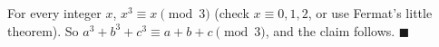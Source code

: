 For every integer $x$, $x^3\equiv x\pmod3$ (check $x\equiv0,1,2$, or use Fermat's little theorem). So $a^3+b^3+c^3\equiv a+b+c\pmod3$, and the claim follows. $\blacksquare$
